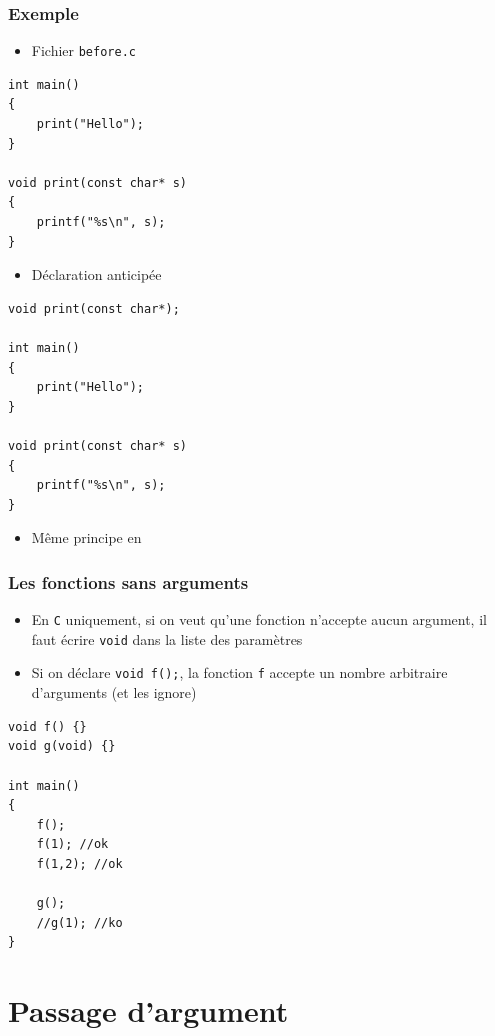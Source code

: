 \begin{frame}[containsverbatim]
\frametitle{Exemple}
\begin{itemize}
\item Fichier \texttt{before.c}
\end{itemize}
\begin{lstlisting}
int main()
{
	print("Hello");
}

void print(const char* s)
{
	printf("%s\n", s);
}
\end{lstlisting}
\begin{itemize}
\item Déclaration anticipée
\end{itemize}
\begin{lstlisting}
void print(const char*);

int main()
{
	print("Hello");
}

void print(const char* s)
{
	printf("%s\n", s);
}
\end{lstlisting}
\begin{itemize}
\item Même principe en \cpp
\end{itemize}
\end{frame}

\begin{frame}[containsverbatim]
\frametitle{Les fonctions sans arguments}
\begin{itemize}
\item En \texttt{C} uniquement, si on veut qu'une fonction n'accepte aucun argument, il faut écrire \lstinline|void| dans la liste des paramètres
\item Si on déclare \lstinline|void f();|, la fonction \texttt{f} accepte un nombre arbitraire d'arguments (et les ignore)
\end{itemize}
\begin{lstlisting}
void f() {}
void g(void) {}

int main()
{
    f();
    f(1); //ok
    f(1,2); //ok
    
    g();
    //g(1); //ko    
}
\end{lstlisting}
\end{frame}

\section{Passage d'argument}

